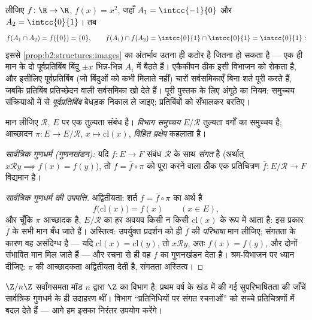 \begin{example}[जहाँ प्रतिबिंब का अंतर्भाव यथार्थतः कठोर है]\label{ex:b2:structures:imagestrict}
लीजिए $f \colon \R \to \R$, $f(x) = x^2$, जहाँ $A_1 =
\intcc{-1}{0}$ और $A_2 = \intcc{0}{1}$। तब
\[
f(A_1 \cap A_2) = f(\{0\}) = \{0\},
\qquad
f(A_1) \cap f(A_2) = \intcc{0}{1} \cap \intcc{0}{1} =
\intcc{0}{1} :
\]
इससे \cref{prop:b2:structures:images} का अंतर्भाव उतना ही कठोर है
जितना हो सकता है --- एक ही मान के दो पूर्वप्रतिबिंब बिंदु $\pm x$ भिन्न-भिन्न $A_i$ में बैठते हैं। एकैकीपन ठीक इसी विभाजन को रोकता है,
और इसीलिए पूर्वप्रतिबिंब (जो बिंदुओं को कभी मिलाते नहीं) चारों
सर्वसमिकाएँ बिना शर्त पूरी करते हैं, जबकि प्रतिबिंब प्रतिच्छेदन वाली
सर्वसमिका खो देते हैं। पूरी पुस्तक के लिए अंगूठे का नियम: समुच्चय
संक्रियाओं में से \emph{पूर्वप्रतिबिंब} बेधड़क निकाल ले जाइए; प्रतिबिंबों
को सँभालकर बरतिए।
\end{example}

\begin{definition}[विभाग समुच्चय]\label{def:b2:structures:quotient}
मान लीजिए $\mathcal{R}$, $E$ पर एक तुल्यता संबंध है। \emph{विभाग
समुच्चय} $E/\mathcal{R}$ तुल्यता वर्गों का समुच्चय है; आच्छादन $\pi \colon E \to E/\mathcal{R}$,
$x \mapsto \mathrm{cl}(x)$, \emph{विहित प्रक्षेप} कहलाता है।

\emph{सार्वत्रिक गुणधर्म (गुणनखंडन):} यदि $f \colon E \to F$ संबंध $\mathcal{R}$ के साथ
\emph{संगत} है (अर्थात् $x \mathbin{\mathcal{R}}
y \implies f(x) = f(y)$), तो $f = \overline f \circ \pi$ को पूरा करने वाला ठीक एक प्रतिचित्रण $\overline f
\colon E/\mathcal{R} \to F$ विद्यमान है।
\end{definition}

\begin{proof}[सार्वत्रिक गुणधर्म की उपपत्ति]
अद्वितीयता: शर्त $f = \overline f \circ \pi$ का अर्थ है
\[
\overline f\bigl(\mathrm{cl}(x)\bigr) = f(x)
\qquad (x \in E),
\]
और चूँकि $\pi$ आच्छादक है, $E/\mathcal{R}$ का हर अवयव किसी न किसी $\mathrm{cl}(x)$ के रूप में
आता है: इस प्रकार $\overline f$ के सभी मान बँध जाते हैं। अस्तित्व: उपर्युक्त
प्रदर्शन को ही $\overline f$ की \emph{परिभाषा} मान लीजिए; संगतता के कारण वह
असंदिग्ध है --- यदि $\mathrm{cl}(x) =
\mathrm{cl}(y)$, तो $x \mathbin{\mathcal{R}} y$, अतः $f(x) =
f(y)$, और दोनों संभावित मान
मिल जाते हैं --- और रचना से ही वह $f$ का गुणनखंडन देता है। श्रम-विभाजन
पर ध्यान दीजिए: $\pi$ की आच्छादकता अद्वितीयता देती है, संगतता अस्तित्व।
\end{proof}

\begin{example}
$\Z/n\Z$ सर्वांगसमता मॉड $n$ द्वारा $\Z$ का विभाग है; प्रथम वर्ष के खंड
में की गई सुपरिभाषितता की जाँचें सार्वत्रिक गुणधर्म के ही उदाहरण थीं।
विभाग ``प्रतिनिधियों पर संगत रचनाओं'' को सच्चे प्रतिचित्रणों में बदल देते
हैं --- आगे हम इसका निरंतर उपयोग करेंगे।
\end{example}

